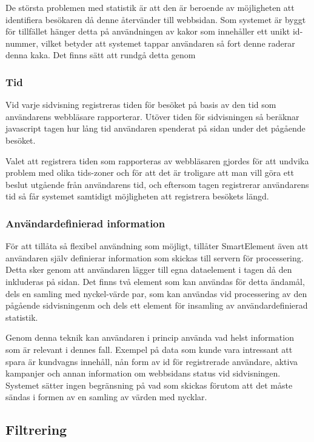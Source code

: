 De största problemen med statistik är att den är beroende av möjligheten att identifiera besökaren då denne återvänder till webbsidan. Som systemet är byggt för tillfället hänger detta på användningen av kakor som innehåller ett unikt id-nummer, vilket betyder att systemet tappar användaren så fort denne raderar denna kaka. Det finns sätt att rundgå detta genom


\subsubsection{Tid}

Vid varje sidvisning registreras tiden för besöket på basis av den tid som användarens webbläsare rapporterar. Utöver tiden för sidvisningen så beräknar javascript tagen hur lång tid användaren spenderat på sidan under det pågående besöket.

Valet att registrera tiden som rapporteras av webbläsaren gjordes för att undvika problem med olika tids-zoner och för att det är troligare att man vill göra ett beslut utgående från användarens tid, och eftersom tagen registrerar användarens tid så får systemet samtidigt möjligheten att registrera besökets längd.

\subsubsection{Användardefinierad information}

För att tillåta så flexibel användning som möjligt, tillåter SmartElement även att användaren själv definierar information som skickas till servern för processering. Detta sker genom att användaren lägger till egna dataelement i tagen då den inkluderas på sidan. Det finns två element som kan användas för detta ändamål, dels en samling med nyckel-värde par, som kan användas vid processering av den pågående sidvisningenm och dels ett element för insamling av användardefinierad statistik.

Genom denna teknik kan användaren i princip använda vad helst information som är relevant i dennes fall. Exempel på data som kunde vara intressant att spara är kundvagns innehåll, nån form av id för registrerade användare, aktiva kampanjer och annan information om webbsidans status vid sidvisningen. Systemet sätter ingen begränsning på vad som skickas förutom att det måste sändas i formen av en samling av värden med nycklar.

\subsection{Filtrering}

